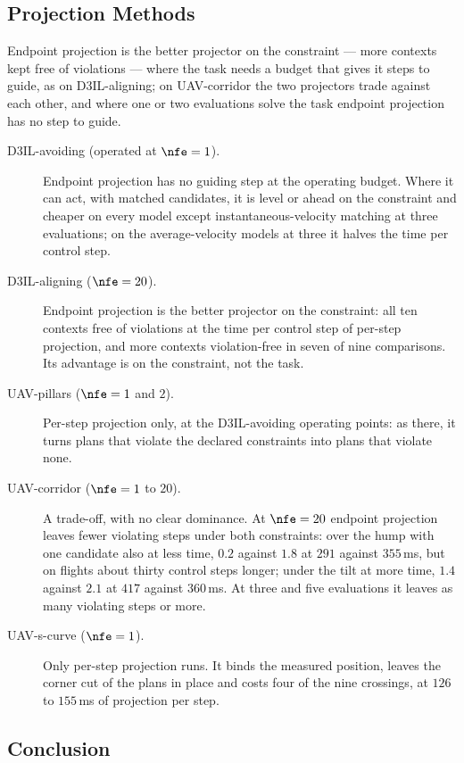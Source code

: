 \subsection{Projection Methods}\label{sec:res:constraints}

Endpoint projection is the better projector on the constraint --- more contexts kept free of violations --- where the task needs a budget that gives it
steps to guide, as on D3IL-aligning; on UAV-corridor the two projectors trade against each other, and where one
or two evaluations solve the task endpoint projection has no step to guide.

\begin{description}
  \item[D3IL-avoiding (operated at $\nfe=1$).] Endpoint projection has no guiding step at the operating
    budget. Where it can act, with matched candidates, it is level or ahead on the constraint and cheaper on
    every model except instantaneous-velocity matching at three evaluations; on the average-velocity models
    at three it halves the time per control step.
  \item[D3IL-aligning ($\nfe=20$).] Endpoint projection is the better projector on the constraint: all ten
    contexts free of violations at the time per control step of per-step projection, and more contexts
    violation-free in seven of nine comparisons. Its advantage is on the constraint, not the task.
  \item[UAV-pillars ($\nfe=1$ and $2$).] Per-step projection only, at the D3IL-avoiding operating points: as
    there, it turns plans that violate the declared constraints into plans that violate none.
  \item[UAV-corridor ($\nfe=1$ to $20$).] A trade-off, with no clear dominance. At $\nfe=20$ endpoint
    projection leaves fewer violating steps under both constraints: over the hump with one candidate also at
    less time, $0.2$ against $1.8$ at $291$ against $355$\,ms, but on flights about thirty control steps
    longer; under the tilt at more time, $1.4$ against $2.1$ at $417$ against $360$\,ms. At three and five
    evaluations it leaves as many violating steps or more.
  \item[UAV-s-curve ($\nfe=1$).] Only per-step projection runs. It binds the measured position, leaves the
    corner cut of the plans in place and costs four of the nine crossings, at $126$ to $155$\,ms of
    projection per step.
\end{description}

\subsection{Conclusion}\label{sec:res:summary:conclusion}

